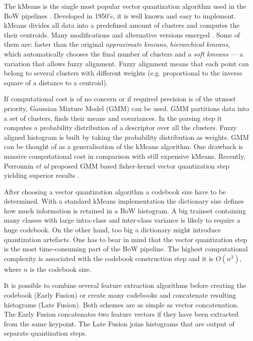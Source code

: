 \documentclass[11pt,twoside]{article}
\begin{document}
    The kMeans is the single most popular vector quantization algorithm used in the BoW pipelines \cite{tsai2012bag}. Developed in 1950's, it is well known and easy to implement. kMeans divides all data into a predefined amount of clusters and computes the their centroids. Many modifications and alternative versions emerged \cite{kmeans_jain2010data}. Some of them are: faster than the original \emph{approximate kmeans}, \emph{hierarchical kmeans}, which automatically chooses the final number of clusters and a \emph{soft kmeans} --- a variation that allows fuzzy alignment. Fuzzy alignment means that each point can belong to several clusters with different weights (e.g. proportional to the inverse square of a distance to a centroid). 
    
    If computational cost is of no concern or if required precision is of the utmost priority, Gaussian Mixture Model (GMM) can be used. GMM partitions data into a set of clusters, finds their means and covariances. In the parsing step it computes a probability distribution of a descriptor over all the clusters. Fuzzy aligned histogram is built by taking the probability distribution as weights. GMM can be thought of as a generalisation of the kMeans algorithm. One drawback is massive computational cost in comparison with still expensive kMeans. Recently, Perronnin \textit{et al} proposed GMM based fisher-kernel vector quantization step yielding superior results \cite{fisher1, fisher2}.		
    
    After choosing a vector quantization algorithm a codebook size have to be determined. With a standard kMeans implementation the dictionary size defines how much information is retained in a BoW histogram. A big trainset containing many classes with large intra-class and inter-class variance is likely to require a huge codebook. On the other hand, too big a dictionary might introduce quantization artefacts. One has to bear in mind that the vector quantization step is the most time-consuming part of the BoW pipeline. The highest computational complexity is associated with the codebook construction step and it is $O(n^3)$, where $n$ is the codebook size.		
    
    It is possible to combine several feature extraction algorithms before creating the codebook (Early Fusion) or create many codebooks and concatenate resulting histograms (Late Fusion). Both schemes are as simple as vector concatenation. The Early Fusion concatenates two feature vectors if they have been extracted from the same keypoint. The Late Fusion joins histograms that are output of separate quantization steps.
\end{document}
